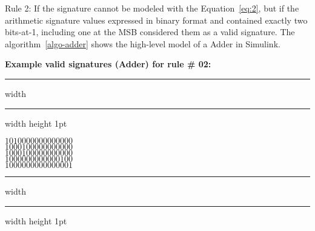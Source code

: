 Rule 2: If the signature cannot be modeled with the Equation~\ref{eq:2}, but if the arithmetic signature values expressed in binary format and contained exactly two bits-at-1, including one at the MSB considered them as a valid signature. The algorithm~\ref{algo-adder} shows the high-level model of a Adder in Simulink.


\hspace{-0.3 cm}\textbf{Example valid signatures (Adder) for rule \# 02:}
\hrule height 2pt width \hsize \kern 1pt \hrule width \hsize height 1pt
\begin{center}
$1010 0000 0000 0000$ \\
$1000 1000 0000 0000$ \\
$1000 1000 0000 0000$ \\
$1000 0000 0000 0100$ \\
$1000 0000 0000 0001$ \\
\end{center}
\hrule height 2pt width \hsize \kern 1pt \hrule width \hsize height 1pt


